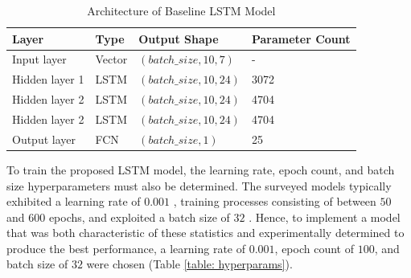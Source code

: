 \documentclass[a4paper, 11pt]{report}
\begin{document}
    \begin{table}[ht]
        \centering
        \begin{tabular}{|l|l|l|l|} 
        \hline
        \textbf{Layer} & \textbf{Type} & \textbf{Output Shape}   & \textbf{Parameter Count}  \\ 
        \hline
        Input layer    & Vector        & $(batch\_size, 10, 7)$  & -                         \\ 
        \hline
        Hidden layer 1 & LSTM          & $(batch\_size, 10, 24)$ & 3072                      \\ 
        \hline
        Hidden layer 2 & LSTM          & $(batch\_size, 10, 24)$ & 4704                      \\ 
        \hline
        Hidden layer 2 & LSTM          & $(batch\_size, 10, 24)$ & 4704                      \\ 
        \hline
        Output layer   & FCN           & $(batch\_size, 1)$      & 25                        \\
        \hline
        \end{tabular}
        \caption{\centering Architecture of Baseline LSTM Model}
        \label{table: architecture}
    \end{table}


    To train the proposed LSTM model, the learning rate, epoch count, and batch size hyperparameters must also be determined. The surveyed models typically exhibited a learning rate of $0.001$ \citep{zhang-2022}, training processes consisting of between $50$ \citep{rahimikia-2020} and $600$ \citep{xiong-2016} epochs, and exploited a batch size of $32$ \citep{xiong-2016}. Hence, to implement a model that was both characteristic of these statistics and experimentally determined to produce the best performance, a learning rate of $0.001$, epoch count of $100$, and batch size of $32$ were chosen (Table  \ref{table: hyperparams}).
\end{document}
